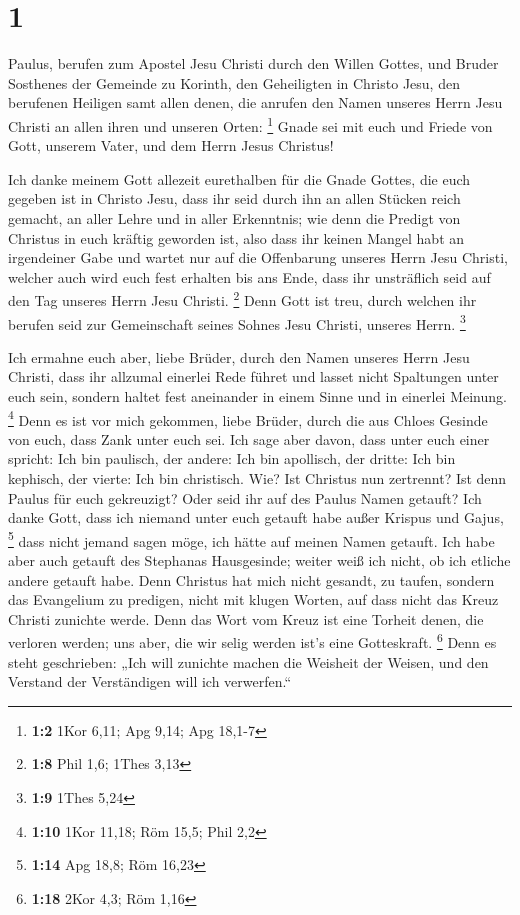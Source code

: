 \hypertarget{section}{%
\section{1}\label{section}}

 Paulus, berufen zum Apostel Jesu Christi durch den Willen
Gottes, und Bruder Sosthenes  der Gemeinde zu Korinth, den
Geheiligten in Christo Jesu, den berufenen Heiligen samt allen denen,
die anrufen den Namen unseres Herrn Jesu Christi an allen ihren und
unseren Orten: \footnote{\textbf{1:2} 1Kor 6,11; Apg 9,14; Apg 18,1-7}
 Gnade sei mit euch und Friede von Gott, unserem Vater, und
dem Herrn Jesus Christus!

 Ich danke meinem Gott allezeit eurethalben für die Gnade
Gottes, die euch gegeben ist in Christo Jesu,  dass ihr seid
durch ihn an allen Stücken reich gemacht, an aller Lehre und in aller
Erkenntnis;  wie denn die Predigt von Christus in euch
kräftig geworden ist,  also dass ihr keinen Mangel habt an
irgendeiner Gabe und wartet nur auf die Offenbarung unseres Herrn Jesu
Christi,  welcher auch wird euch fest erhalten bis ans Ende,
dass ihr unsträflich seid auf den Tag unseres Herrn Jesu Christi.
\footnote{\textbf{1:8} Phil 1,6; 1Thes 3,13}  Denn Gott ist
treu, durch welchen ihr berufen seid zur Gemeinschaft seines Sohnes Jesu
Christi, unseres Herrn. \footnote{\textbf{1:9} 1Thes 5,24}

 Ich ermahne euch aber, liebe Brüder, durch den Namen
unseres Herrn Jesu Christi, dass ihr allzumal einerlei Rede führet und
lasset nicht Spaltungen unter euch sein, sondern haltet fest aneinander
in einem Sinne und in einerlei Meinung. \footnote{\textbf{1:10} 1Kor
  11,18; Röm 15,5; Phil 2,2}  Denn es ist vor mich
gekommen, liebe Brüder, durch die aus Chloes Gesinde von euch, dass Zank
unter euch sei.  Ich sage aber davon, dass unter euch einer
spricht: Ich bin paulisch, der andere: Ich bin apollisch, der dritte:
Ich bin kephisch, der vierte: Ich bin christisch.  Wie? Ist
Christus nun zertrennt? Ist denn Paulus für euch gekreuzigt? Oder seid
ihr auf des Paulus Namen getauft?  Ich danke Gott, dass ich
niemand unter euch getauft habe außer Krispus und Gajus, \footnote{\textbf{1:14}
  Apg 18,8; Röm 16,23}  dass nicht jemand sagen möge, ich
hätte auf meinen Namen getauft.  Ich habe aber auch getauft
des Stephanas Hausgesinde; weiter weiß ich nicht, ob ich etliche andere
getauft habe.  Denn Christus hat mich nicht gesandt, zu
taufen, sondern das Evangelium zu predigen, nicht mit klugen Worten, auf
dass nicht das Kreuz Christi zunichte werde.  Denn das Wort
vom Kreuz ist eine Torheit denen, die verloren werden; uns aber, die wir
selig werden ist's eine Gotteskraft. \footnote{\textbf{1:18} 2Kor 4,3;
  Röm 1,16}  Denn es steht geschrieben: „Ich will zunichte
machen die Weisheit der Weisen, und den Verstand der Verständigen will
ich verwerfen.``


